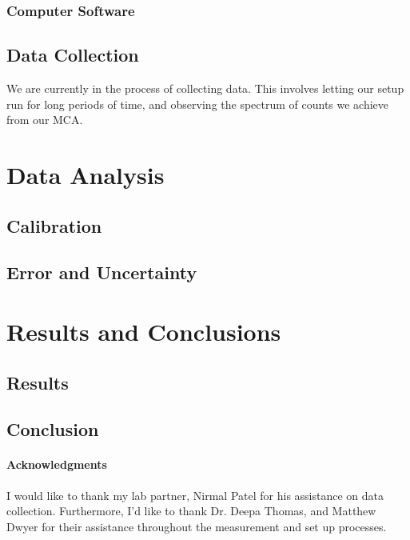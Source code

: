 \documentclass[10pt,letterpaper,onecolumn]{article}
\begin{document}
\subsubsection{Computer Software}
\subsection{Data Collection}
We are currently in the process of collecting data. This involves letting our setup run for long periods of time, and observing the spectrum of counts we achieve from our MCA.
\section{Data Analysis}
\subsection{Calibration}
\subsection{Error and Uncertainty}
\section{Results and Conclusions}
\subsection{Results}
\subsection{Conclusion}
\paragraph*{Acknowledgments}
I would like to thank my lab partner, Nirmal Patel for his assistance on data collection. Furthermore, I'd like to thank Dr. Deepa Thomas, and Matthew Dwyer for their assistance throughout the measurement and set up processes. 
\newpage
 
\end{document}
